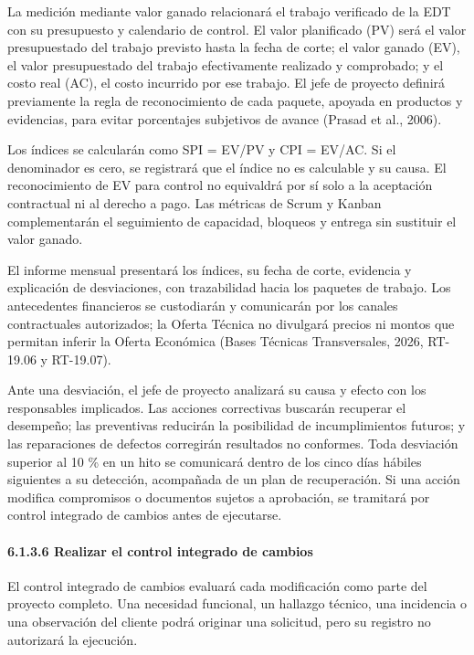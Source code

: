 \documentclass[11pt]{article}
\begin{document}
La medición mediante valor ganado relacionará el trabajo verificado de
la EDT con su presupuesto y calendario de control. El valor planificado
(PV) será el valor presupuestado del trabajo previsto hasta la fecha de
corte; el valor ganado (EV), el valor presupuestado del trabajo
efectivamente realizado y comprobado; y el costo real (AC), el costo
incurrido por ese trabajo. El jefe de proyecto definirá previamente la
regla de reconocimiento de cada paquete, apoyada en productos y
evidencias, para evitar porcentajes subjetivos de avance (Prasad et al.,
2006).

Los índices se calcularán como SPI = EV/PV y CPI = EV/AC. Si el
denominador es cero, se registrará que el índice no es calculable y su
causa. El reconocimiento de EV para control no equivaldrá por sí solo a
la aceptación contractual ni al derecho a pago. Las métricas de Scrum y
Kanban complementarán el seguimiento de capacidad, bloqueos y entrega
sin sustituir el valor ganado.

El informe mensual presentará los índices, su fecha de corte, evidencia
y explicación de desviaciones, con trazabilidad hacia los paquetes de
trabajo. Los antecedentes financieros se custodiarán y comunicarán por
los canales contractuales autorizados; la Oferta Técnica no divulgará
precios ni montos que permitan inferir la Oferta Económica (Bases
Técnicas Transversales, 2026, RT-19.06 y RT-19.07).

Ante una desviación, el jefe de proyecto analizará su causa y efecto con
los responsables implicados. Las acciones correctivas buscarán recuperar
el desempeño; las preventivas reducirán la posibilidad de
incumplimientos futuros; y las reparaciones de defectos corregirán
resultados no conformes. Toda desviación superior al 10 \% en un hito se
comunicará dentro de los cinco días hábiles siguientes a su detección,
acompañada de un plan de recuperación. Si una acción modifica
compromisos o documentos sujetos a aprobación, se tramitará por control
integrado de cambios antes de ejecutarse.

\paragraph{6.1.3.6 Realizar el control integrado de cambios}\label{6-1-3-6-realizar-el-control-integrado-de-cambios}

El control integrado de cambios evaluará cada modificación como parte del proyecto completo. Una necesidad funcional, un hallazgo técnico, una incidencia o una observación del cliente podrá originar una solicitud, pero su registro no autorizará la ejecución.
\end{document}
